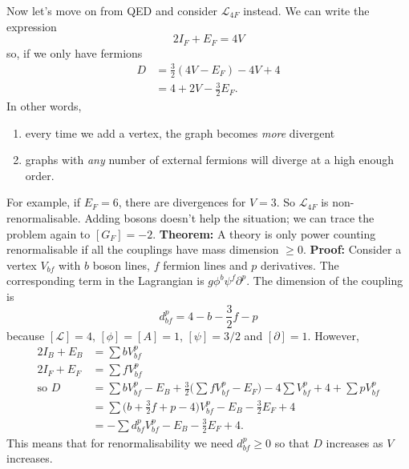 \documentclass[a4paper,12pt]{article}
\begin{document}
Now let's move on from QED and consider $\mathcal{L}_{4F}$ instead. We can write the expression
\begin{equation}
2I_F + E_F = 4V
\end{equation}
so, if we only have fermions
\begin{equation}
\begin{split}
D &= \frac{3}{2}(4V-E_F) - 4V + 4 \\
&= 4 + 2V - \frac{3}{2} E_F.
\end{split}
\end{equation}
In other words,
\begin{enumerate}
\item every time we add a vertex, the graph becomes \textit{more} divergent
\item graphs with \textit{any} number of external fermions will diverge at a high enough order.
\end{enumerate}
For example, if $E_F = 6$, there are divergences for $V=3$. So $\mathcal{L}_{4F}$ is non-renormalisable. Adding bosons doesn't help the situation; we can trace the problem again to $[G_F]=-2$. 
\newline
\newline
\textbf{Theorem: } A theory is only power counting renormalisable if all the couplings have mass dimension $\geq 0$.
\newline
\textbf{Proof: } Consider a vertex $V_{bf}$ with $b$ boson lines, $f$ fermion lines and $p$ derivatives. The corresponding term in the Lagrangian is $g\phi^b\psi^f\partial^p$. The dimension of the coupling is
\begin{equation}
d_{bf}^p = 4 - b - \frac{3}{2}f - p
\end{equation}
because $[\mathcal{L}]=4$, $[\phi]=[A]=1$, $[\psi]=3/2$ and $[\partial]=1$. However,
\begin{equation}
\begin{split}
2I_B + E_B &= \sum bV_{bf}^p \\
2I_F + E_F &= \sum fV_{bf}^p \\
\text{so } D &= \sum bV_{bf}^p - E_B + \frac{3}{2}\big(\sum fV_{bf}^p - E_F\big) - 4 \sum V_{bf}^p + 4 + \sum p V_{bf}^p \\
&= \sum\big(b + \frac{3}{2}f + p - 4\big)V_{bf}^p - E_B - \frac{3}{2}E_F + 4 \\
&= -\sum d_{bf}^pV_{bf}^p - E_B - \frac{3}{2}E_F + 4.
\end{split}
\end{equation}
This means that for renormalisability we need $d_{bf}^p \geq 0$ so that $D$ increases as $V$ increases.
\end{document}
